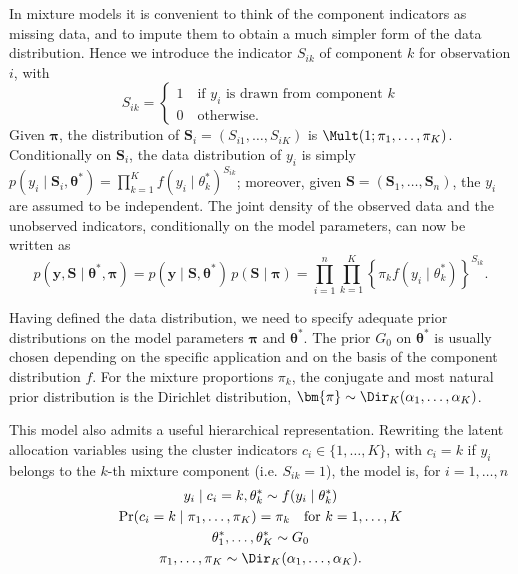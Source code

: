 In mixture models it is convenient to think of the component indicators as missing data, and to impute them to obtain a much simpler form of the data distribution. Hence we introduce the indicator $S_{ik}$ of component $k$ for observation $i$, with 
\begin{equation*}
S_{ik} = \begin{cases}
1 \quad \text{if $y_i$ is drawn from component $k$}\\
0 \quad \text{otherwise}.
\end{cases}
\end{equation*}
Given $\bm{\pi}$, the distribution of $\bm{S}_i = (S_{i1},\dots,S_{iK})$ is $\Mult(1;\pi_1,\dots,\pi_K)$. 
Conditionally on $\bm{S}_{i}$, the data distribution of $y_i$ is simply $p(y_i\mid \bm{S}_i,\bm{\theta}^*) = \prod_{k=1}^K f(y_i\mid\theta_k^*)^{S_{ik}}$; moreover, given $\bm{S}=(\bm{S}_1,\dots,\bm{S}_n)$, the $y_i$ are assumed to be independent.
The joint density of the observed data and the unobserved indicators, conditionally on the model parameters, can now be written as 
\begin{equation*}
p(\bm{y},\bm{S}\mid \bm{\theta}^*,\bm{\pi}) = p(\bm{y}\mid\bm{S},\bm{\theta}^*)\, p(\bm{S}\mid\bm{\pi}) = 
\prod_{i=1}^n \prod_{k=1}^K \left\{ \pi_k f(y_i\mid\theta_k^*) \right\}^{S_{ik}}.
\end{equation*}

Having defined the data distribution, we need to specify adequate prior distributions on the model parameters $\bm{\pi}$ and $\bm{\theta}^*$. The prior $G_0$ on $\bm{\theta}^*$ is usually chosen depending on the specific application and on the basis of the component distribution $f$. For the mixture proportions $\pi_k$, the conjugate and most natural prior distribution is the Dirichlet distribution, $\bm{\pi}\sim \Dir_K(\alpha_1,\dots,\alpha_K)$.

This model also admits a useful hierarchical representation. Rewriting the latent allocation variables using the cluster indicators $c_i\in\{1,\dots,K\}$, with $c_i=k$ if $y_i$ belongs to the $k$-th mixture component (i.e. $S_{ik} = 1$), the model is, for $i = 1,\dots,n$ 
\begin{equation}
\begin{gathered}
y_i \mid c_i = k, \theta^*_k \sim f(y_i\mid\theta^*_k)\\
\Pr(c_i = k \mid \pi_1,\dots,\pi_K) = \pi_k \quad \text{for } k = 1,\dots,K\\ 
\theta^*_1,\dots,\theta^*_K \sim G_0\\
\pi_1,\dots,\pi_K  \sim \Dir_K(\alpha_1,\dots,\alpha_K).
\end{gathered}
\label{eq:ch1_finitemix_h1}
\end{equation}

